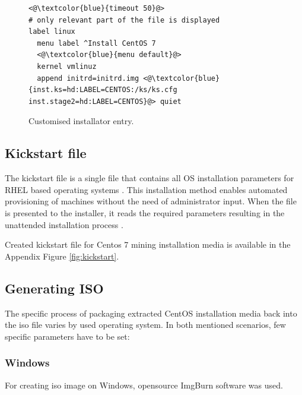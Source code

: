 \documentclass[
  printed, %
  table,   %
  nolof,     %
  nolot,     %
           oneside, color
]{fithesis3}
\renewcommand{\texttt}[1]{%
  \begingroup
  \ttfamily
  \begingroup\lccode`~=`/\lowercase{\endgroup\def~}{/\discretionary{}{}{}}%
  \begingroup\lccode`~=`[\lowercase{\endgroup\def~}{[\discretionary{}{}{}}%
  \begingroup\lccode`~=`.\lowercase{\endgroup\def~}{.\discretionary{}{}{}}%
  \catcode`/=\active\catcode`[=\active\catcode`.=\active
  \scantokens{#1\noexpand}%
  \endgroup
}
\begin{document}
\begin{figure}[H]
\begin{center}
\begin{lstlisting}
<@\textcolor{blue}{timeout 50}@>
# only relevant part of the file is displayed
label linux
  menu label ^Install CentOS 7
  <@\textcolor{blue}{menu default}@>
  kernel vmlinuz
  append initrd=initrd.img <@\textcolor{blue}{inst.ks=hd:LABEL=CENTOS:/ks/ks.cfg inst.stage2=hd:LABEL=CENTOS}@> quiet
\end{lstlisting}
\caption{Customised installator entry.}
    \label{pic:codeinjectiongui}
\end{center}
    \end{figure}
\subsection{Kickstart file}
The kickstart file is a single file that contains all OS installation parameters for RHEL based operating systems \cite{van2015red}. This installation method enables automated provisioning of machines without the need of administrator input. When the file is presented to the installer, it reads the required parameters resulting in the unattended installation process \cite{leemans2015red}.

Created kickstart file for Centos 7 mining installation media is available in the Appendix Figure \ref{fig:kickstart}. 

\subsection{Generating ISO}
The specific process of packaging extracted CentOS installation media back into the iso file varies by used operating system. In both mentioned scenarios, few specific parameters have to be set:
\subsubsection{Windows}
For creating iso image on Windows, opensource ImgBurn software was used. 
\end{document}
